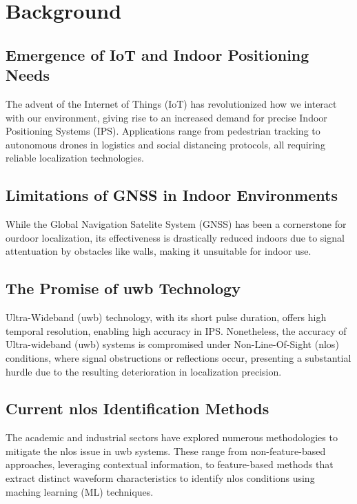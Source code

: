 \section{Background}\label{background}

\subsection{Emergence of IoT and Indoor Positioning Needs}\label{Emergence of IoT and Indoor Positioning Needs}
The advent of the Internet of Things (IoT) has revolutionized how we interact with our environment, giving rise to an increased demand for precise Indoor Positioning Systems (IPS). Applications range from pedestrian tracking to autonomous drones in logistics and social distancing protocols, all requiring reliable localization technologies.

\subsection{Limitations of GNSS in Indoor Environments}\label{Limitations of GNSS in Indoor Environments}
While the Global Navigation Satelite System (GNSS) has been a cornerstone for ourdoor localization, its effectiveness is drastically reduced indoors due to signal attentuation by obstacles like walls, making it unsuitable for indoor use.

\subsection{The Promise of \gls{uwb} Technology}\label{The Promise of UWB Technology}
Ultra-Wideband (\gls{uwb}) technology, with its short pulse duration, offers high temporal resolution, enabling high accuracy in IPS. Nonetheless, the accuracy of Ultra-wideband (\gls{uwb}) systems is compromised under Non-Line-Of-Sight (\gls{nlos}) conditions, where signal obstructions or reflections occur, presenting a substantial hurdle due to the resulting deterioration in localization precision.

\subsection{Current \gls{nlos} Identification Methods}\label{Current NLOS Identification Methods}
The academic and industrial sectors have explored numerous methodologies to mitigate the \gls{nlos} issue in \gls{uwb} systems. These range from non-feature-based approaches, leveraging contextual information, to feature-based methods that extract distinct waveform characteristics to identify \gls{nlos} conditions using maching learning (ML) techniques.

